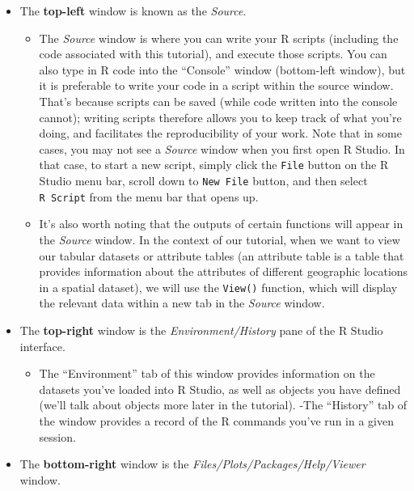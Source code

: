 \documentclass[
]{article}
\providecommand{\tightlist}{%
  \setlength{\itemsep}{0pt}\setlength{\parskip}{0pt}}
\begin{document}
\begin{itemize}
\tightlist
\item
  The \textbf{top-left} window is known as the \emph{Source}.

  \begin{itemize}
  \tightlist
  \item
    The \emph{Source} window is where you can write your R scripts (including the code associated with this tutorial), and execute those scripts. You can also type in R code into the ``Console'' window (bottom-left window), but it is preferable to write your code in a script within the source window. That's because scripts can be saved (while code written into the console cannot); writing scripts therefore allows you to keep track of what you're doing, and facilitates the reproducibility of your work. Note that in some cases, you may not see a \emph{Source} window when you first open R Studio. In that case, to start a new script, simply click the \texttt{File} button on the R Studio menu bar, scroll down to \texttt{New\ File} button, and then select \texttt{R\ Script} from the menu bar that opens up.
  \item
    It's also worth noting that the outputs of certain functions will appear in the \emph{Source} window. In the context of our tutorial, when we want to view our tabular datasets or attribute tables (an attribute table is a table that provides information about the attributes of different geographic locations in a spatial dataset), we will use the \texttt{View()} function, which will display the relevant data within a new tab in the \emph{Source} window.
  \end{itemize}
\item
  The \textbf{top-right} window is the \emph{Environment/History} pane of the R Studio interface.

  \begin{itemize}
  \tightlist
  \item
    The ``Environment'' tab of this window provides information on the datasets you've loaded into R Studio, as well as objects you have defined (we'll talk about objects more later in the tutorial).
    -The ``History'' tab of the window provides a record of the R commands you've run in a given session.
  \end{itemize}
\item
  The \textbf{bottom-right} window is the \emph{Files/Plots/Packages/Help/Viewer} window.


\end{itemize}
\end{document}
